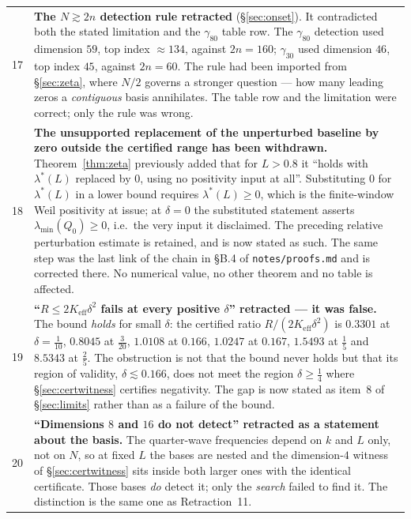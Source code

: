 \documentclass[11pt,a4paper]{article}
\theoremstyle{definition}
\theoremstyle{remark}
\newcommand{\lmin}{\lambda_{\min}}
\newcommand{\lstar}{\lambda^{*}}
\newcommand{\src}[1]{{\footnotesize\texttt{#1}}}
\begin{document}
\begin{center}
\begin{longtable}{@{}cp{}@{}}
17 & \textbf{The $N\gtrsim2n$ detection rule retracted} (\S\ref{sec:onset}). It contradicted
both the stated limitation and the $\gamma_{80}$ table row. The $\gamma_{80}$ detection used
dimension $59$, top index ${\approx}134$, against $2n=160$; $\gamma_{30}$ used dimension
$46$, top index $45$, against $2n=60$. The rule had been imported from \S\ref{sec:zeta},
where $N/2$ governs a stronger question --- how many leading zeros a \emph{contiguous} basis
annihilates. The table row and the limitation were correct; only the rule was wrong. \\
18 & \textbf{The unsupported replacement of the unperturbed baseline by zero outside the
certified range has been withdrawn.} Theorem~\ref{thm:zeta} previously added that for
$L>0.8$ it ``holds with $\lstar(L)$ replaced by $0$, using no positivity input at all''.
Substituting $0$ for $\lstar(L)$ in a lower bound requires $\lstar(L)\ge0$, which is the
finite-window Weil positivity at issue; at $\delta=0$ the substituted statement asserts
$\lmin(Q_0)\ge0$, i.e.\ the very input it disclaimed. The preceding relative perturbation
estimate is retained, and is now stated as such. The same step was the last link of the chain
in \S B.4 of \src{notes/proofs.md} and is corrected there. No numerical value, no other
theorem and no table is affected. \\
19 & \textbf{``$R\le2K_{\mathrm{eff}}\delta^{2}$ fails at every positive $\delta$'' retracted
--- it was false.} The bound \emph{holds} for small $\delta$: the certified ratio
$R/(2K_{\mathrm{eff}}\delta^{2})$ is $0.3301$ at $\delta=\tfrac1{10}$, $0.8045$ at
$\tfrac3{20}$, $1.0108$ at $0.166$, $1.0247$ at $0.167$, $1.5493$ at $\tfrac15$ and $8.5343$
at $\tfrac25$. The obstruction is not that the bound never holds but that its region of
validity, $\delta\lesssim0.166$, does not meet the region $\delta\ge\tfrac14$ where
\S\ref{sec:certwitness} certifies negativity. The gap is now stated as
item~8 of \S\ref{sec:limits} rather than as a failure of the bound. \\
20 & \textbf{``Dimensions $8$ and $16$ do not detect'' retracted as a statement about the
basis.} The quarter-wave frequencies depend on $k$ and $L$ only, not on $N$, so at fixed $L$
the bases are nested and the dimension-$4$ witness of \S\ref{sec:certwitness} sits inside
both larger ones with the identical certificate. Those bases \emph{do} detect it; only the
\emph{search} failed to find it. The distinction is the same one as Retraction~11. \\
\bottomrule
\end{longtable}
\end{center}
\end{document}

